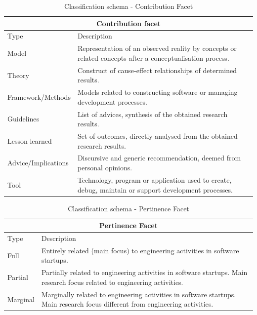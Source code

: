 \documentclass[final,5p,times,twocolumn]{elsarticle}
\begin{document}
\begin{table}[H]
\renewcommand{\arraystretch}{1.1}
\centering 
\scriptsize 
\begin{tabular}{|p{1.35in}|p{3.85in}|}

\hline \hline
\multicolumn{2}{|c|}{\textbf{Contribution facet}} \\
\hline 
Type &	Description\\
\hline  

Model & Representation of an observed reality by concepts or related concepts after a conceptualisation process. \\  
Theory & Construct of cause-effect relationships of determined results.  \\ 
Framework/Methods & Models related to constructing software or managing development processes. \\  
Guidelines & List of advices, synthesis of the obtained research results.  \\  
Lesson learned & Set of outcomes, directly analysed from the obtained research results. \\   
Advice/Implications & Discursive and generic recommendation, deemed from personal opinions. \\    
Tool  & Technology, program or application used to create, debug, maintain or support development processes. \\

\hline \hline 



 \end{tabular}
 \caption{Classification schema - Contribution  Facet}
\label{tab:ms:class-schema-contrib}
\end{table}
\small



\begin{table}[H]
\renewcommand{\arraystretch}{1.1}
\centering
\scriptsize 
\begin{tabular}{|p{1.35in}|p{3.85in}|}
\hline \hline
\multicolumn{2}{|c|}{\textbf{Pertinence Facet}} \\
\hline  
  Type &	Description\\
\hline
Full  & Entirely related (main focus) to engineering activities in software startups.   \\ 
Partial & Partially related to  engineering activities in software startups. Main research focus related to engineering activities. \\ 
Marginal &  Marginally related to engineering activities in software startups. Main research focus different from engineering activities. \\
\hline \hline 
 \end{tabular}
\caption{Classification schema - Pertinence  Facet}
\label{tab:ms:class-schema-pert}
 \end{table}
\small
\end{document}
